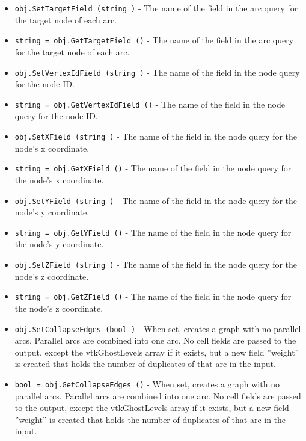 \begin{itemize}
\item  \verb|obj.SetTargetField (string )| -  The name of the field in the arc query for the target node of each arc.

\item  \verb|string = obj.GetTargetField ()| -  The name of the field in the arc query for the target node of each arc.

\item  \verb|obj.SetVertexIdField (string )| -  The name of the field in the node query for the node ID.

\item  \verb|string = obj.GetVertexIdField ()| -  The name of the field in the node query for the node ID.

\item  \verb|obj.SetXField (string )| -  The name of the field in the node query for the node's x coordinate.

\item  \verb|string = obj.GetXField ()| -  The name of the field in the node query for the node's x coordinate.

\item  \verb|obj.SetYField (string )| -  The name of the field in the node query for the node's y coordinate.

\item  \verb|string = obj.GetYField ()| -  The name of the field in the node query for the node's y coordinate.

\item  \verb|obj.SetZField (string )| -  The name of the field in the node query for the node's z coordinate.

\item  \verb|string = obj.GetZField ()| -  The name of the field in the node query for the node's z coordinate.

\item  \verb|obj.SetCollapseEdges (bool )| -  When set, creates a graph with no parallel arcs.
 Parallel arcs are combined into one arc.
 No cell fields are passed to the output, except the vtkGhostLevels array if
 it exists, but a new field ''weight'' is created that holds the number of 
 duplicates of that arc in the input.

\item  \verb|bool = obj.GetCollapseEdges ()| -  When set, creates a graph with no parallel arcs.
 Parallel arcs are combined into one arc.
 No cell fields are passed to the output, except the vtkGhostLevels array if
 it exists, but a new field ''weight'' is created that holds the number of 
 duplicates of that arc in the input.


\end{itemize}
